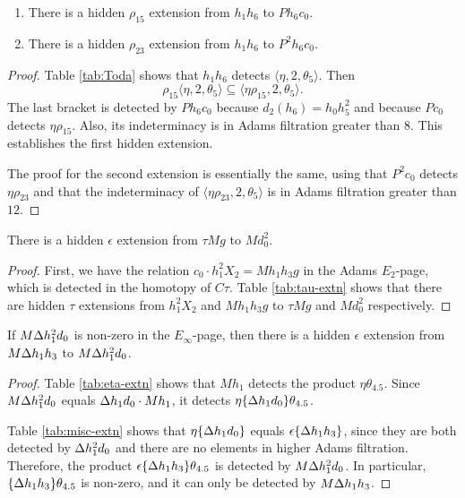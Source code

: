 \begin{lemma}
\label{lem:rho15-h1h6}
\mbox{}
\begin{enumerate}
\item
{}
There is a hidden $\rho_{15}$ extension from
$h_1 h_6$ to $P h_6 c_0$.
\item
{}
There is a hidden $\rho_{23}$ extension from
$h_1 h_6$ to $P^2 h_6 c_0$.
\end{enumerate}
\end{lemma}

\begin{proof}
Table \ref{tab:Toda} shows that
$h_1 h_6$ detects $\langle \eta, 2, \theta_5 \rangle$.
Then
\[
\rho_{15} \langle \eta, 2, \theta_5 \rangle \subseteq
\langle \eta \rho_{15}, 2, \theta_5 \rangle.
\]
The last bracket is detected by $P h_6 c_0$ because
$d_2(h_6) = h_0 h_5^2$ and because
$P c_0$ detects $\eta \rho_{15}$.
Also, its indeterminacy is in Adams filtration greater than $8$.
This establishes the first hidden extension.

The proof for the second extension is essentially the same,
using that 
$P^2 c_0$ detects $\eta \rho_{23}$ and that
the indeterminacy of
$\langle \eta \rho_{23}, 2, \theta_5 \rangle$
is in Adams filtration greater than $12$.
\end{proof}


\begin{lemma}
\label{lem:epsilon-tMg}
There is a hidden $\epsilon$ extension from $\tau M g$ to
$M d_0^2$.
\end{lemma}

\begin{proof}
First, we have the relation $c_0 \cdot h_1^2 X_2 = M h_1 h_3 g$
in the Adams $E_2$-page, which is detected in the homotopy of
$C\tau$.
Table \ref{tab:tau-extn} shows that there are hidden $\tau$
extensions from $h_1^2 X_2$ and $M h_1 h_3 g$
to $\tau M g$ and $M d_0^2$ respectively.
\end{proof}

\begin{lemma}
\label{lem:epsilon-MDh1h3}
If $M \Delta h_1^2 d_0$ is non-zero in the $E_\infty$-page, then
there is a hidden $\epsilon$ extension from $M \Delta h_1 h_3$
to $M \Delta h_1^2 d_0$.
\end{lemma}

\begin{proof}
Table \ref{tab:eta-extn} shows that $M h_1$ detects the 
product $\eta \theta_{4.5}$.
Since $M \Delta h_1^2 d_0$ equals $\Delta h_1 d_0 \cdot M h_1$, it detects
$\eta \{\Delta h_1 d_0\} \theta_{4.5}$.

Table \ref{tab:misc-extn} shows that 
$\eta \{\Delta h_1 d_0\}$ equals 
$\epsilon \{\Delta h_1 h_3\}$, since they are both
detected by $\Delta h_1^2 d_0$ and there are no elements in higher
Adams filtration.
Therefore, the product 
$\epsilon \{\Delta h_1 h_3\} \theta_{4.5}$ is detected
by $M \Delta h_1^2 d_0$.
In particular, $\{\Delta h_1 h_3\} \theta_{4.5}$ is non-zero, and
it can only be detected by $M \Delta h_1 h_3$.
\end{proof}

